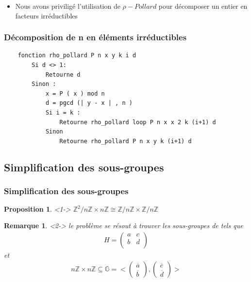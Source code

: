 \documentclass{beamer}
\newtheorem{rmk}{Remarque}
\newtheorem{prp}{Proposition}
\begin{document}
\begin{frame}[fragile]
    \begin{itemize}
        \item Nous avons priviligé l'utilisation de $\rho-Pollard$ pour décomposer un entier en facteurs irréductibles
    \end{itemize}
    \frametitle{Décomposition de n en éléments irréductibles}
    \begin{verbatim}
    fonction rho_pollard P n x y k i d
        Si d <> 1:
            Retourne d
        Sinon :
            x = P ( x ) mod n
            d = pgcd (| y - x | , n )
            Si i = k :
                Retourne rho_pollard loop P n x x 2 k (i+1) d
            Sinon 
                Retourne rho_pollard P n x y k (i+1) d
    \end{verbatim}
\end{frame}

\subsection{Simplification des sous-groupes}
\begin{frame}
\frametitle{Simplification des sous-groupes}
\begin{prp}<1->
    \center $\mathbb{Z}^2/n\mathbb{Z} \times n\mathbb{Z} \cong  \mathbb{Z}/n\mathbb{Z} \times \mathbb{Z}/n\mathbb{Z}$
\end{prp}
\begin{rmk}<2->
    le problème se résout à trouver les sous-groupes  de  tels que
    \begin{align*}
        H = \begin{pmatrix}
            a & c \\
            b & d \\
        \end{pmatrix}
    \end{align*}
    \center et
    \begin{align*}
        n\mathbb{Z} \times n\mathbb{Z} \subseteq \mathbb{G} = < 
            \begin{pmatrix}
                \overline{a} \\
                \overline{b}
            \end{pmatrix}
            ,
            \begin{pmatrix}
                \overline{c} \\
                \overline{d}
            \end{pmatrix}
            >
    \end{align*}
\end{rmk}
\end{frame}
\end{document}
